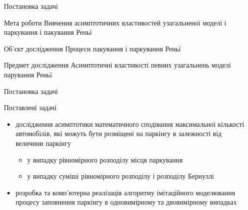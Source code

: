 \begin{frame}{Постановка задачі}
	\manimate
	\vspace{-8pt}
	\begin{block}{Мета роботи}
		 Вивчення асимптотичних властивостей узагальненої моделі і паркування і пакування Реньї
	\end{block} 

	\begin{block}{Об'єкт дослідження}
		Процеси пакування і паркування Реньї
	\end{block}
	
	\begin{block}{Предмет дослідження}
		Асимптотичні властивості певних узагальнень моделі парування Реньї
	\end{block}
\end{frame}

\begin{frame}{Постановка задачі}
	\manimate
	\vspace{-8pt}
		\begin{block}{Поставлені задачі}
			\begin{itemize}
				\item дослідження асимптотики математичного сподівання максимальної кількості автомобілів, які можуть бути розміщені на паркінгу в залежності від величини паркінгу
				\begin{itemize}
					\item у випадку рівномірного розподілу місця паркування
					\item у випадку суміші рівномірного розподілу і розподілу Бернуллі
				\end{itemize}
				\item розробка та комп'ютерна реалізація алгоритму імітаційного моделювання процесу заповнення паркінгу в одновимірному та двовимірному випадках
			\end{itemize}
		\end{block}
\end{frame}
